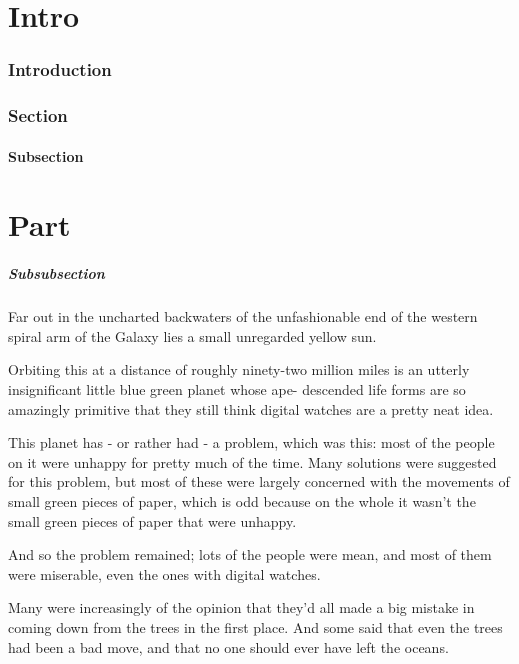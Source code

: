 \part{Intro}

\section{Introduction}
\label{sec:introduction}

\section{Section}
\label{sec:section}

\subsection{Subsection}
\label{sub:subsection}

\part{Part}
\label{prt:part}

\subsubsection{Subsubsection}
\label{ssub:Subsubsection}

Far out in the uncharted backwaters of the unfashionable  end  of the  western
spiral  arm  of  the Galaxy lies a small unregarded yellow sun.

Orbiting this at a distance of roughly ninety-two  million  miles is  an
utterly insignificant little blue green planet whose ape- descended life forms
are so amazingly primitive that  they  still think digital watches are a pretty
neat idea.

This planet has - or rather had - a problem, which was this: most of  the
people  on  it were unhappy for pretty much of the time.  Many solutions were
suggested for this problem, but most of these were  largely  concerned with the
movements of small green pieces of paper, which is odd because on the whole it
wasn't  the  small green pieces of paper that were unhappy.

And so the problem remained; lots of the people  were  mean,  and most of them
were miserable, even the ones with digital watches.

Many were increasingly of the opinion that they'd all made a  big mistake  in
coming  down  from the trees in the first place. And some said that even the
trees had been a bad move,  and  that  no one should ever have left the oceans.

